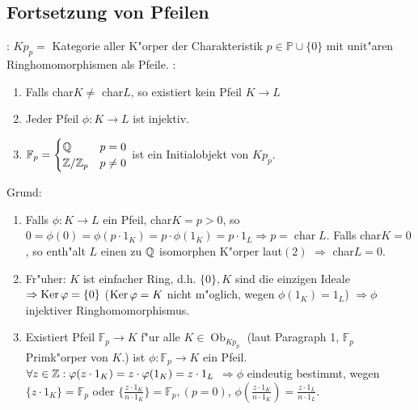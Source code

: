 \long{}
\long{}   
\subsection{Fortsetzung von Pfeilen}
\remind{}:{
 ${Kp}_p=$ Kategorie aller K"orper der Charakteristik $p\in \mathbb{P}\cup \{0\}$
 mit unit"aren Ringhomomorphismen als Pfeile.
 }
\remark{}:{\begin{enumerate}
 \item Falls char$K\neq$ char$L$, so existiert kein Pfeil
 $K \longrightarrow L$
 \item Jeder Pfeil $\phi: K\longrightarrow L$ ist injektiv.
 \item $\mathbb{F}_p=\begin{cases}
 \mathbb Q & p=0 \\
 \mathbb Z/\mathbb Z_p & p\neq 0 \\
 \end{cases}$ ist ein Initialobjekt von $Kp_p$.
 \end{enumerate}
 Grund:
 
 \begin{enumerate}
 \item Falls $\phi: K\longrightarrow L$ ein Pfeil, char$K=p>0$, so
 $0=\phi(0)=\phi(p\cdot 1_K)=p\cdot\phi(1_K)=p\cdot 1_L \Rightarrow p=\operatorname{char}L $.
 Falls char$K=0$, so enth"alt $L$ einen zu $\mathbb Q$ isomorphen K"orper laut$(2)$
 $\Rightarrow$ char$L=0$.
 \item Fr"uher: $K$ ist einfacher Ring, d.h. $\{0\},K$ sind die einzigen Ideale
 $\Rightarrow \operatorname{Ker}\varphi=\{0\}$ ($\operatorname{Ker}\varphi=K$ nicht m"oglich, wegen
 $\phi(1_K)=1_L$) $\Rightarrow \phi$ injektiver Ringhomomorphismus.
 \item Existiert Pfeil $\mathbb{F}_p \longrightarrow K$ f"ur alle $K\in \operatorname{Ob}_{Kp_p}$
 (laut Paragraph 1, $\mathbb{F}_p$ Primk"orper von $K$.)
 ist $\phi:\mathbb{F}_p \longrightarrow K$ ein Pfeil.
 $\forall z\in \mathbb Z:\varphi(z\cdot 1_K)=z\cdot \varphi(1_K)=z\cdot 1_L$
 $\Rightarrow \phi$ eindeutig bestimmt, wegen
 $\{z\cdot 1_K\}=\mathbb{F}_p$ oder $\{\frac{z\cdot 1_K}{n\cdot 1_K}\}=\mathbb{F}_p, (p=0)$,
 $\phi(\frac{z\cdot 1_K}{n\cdot 1_K})=\frac{z\cdot 1_L}{n\cdot 1_L}$.
 \end{enumerate}} 
